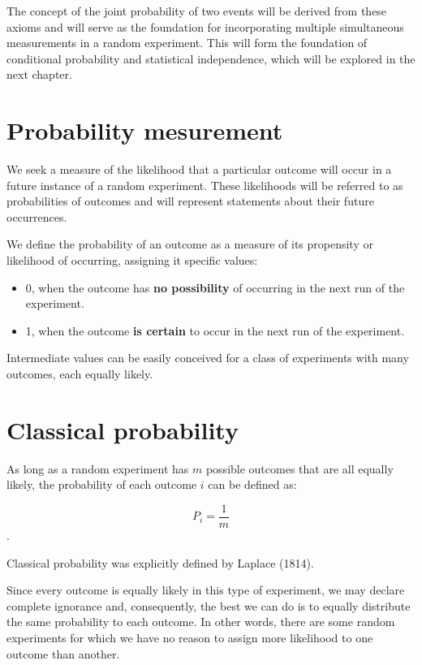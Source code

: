 \documentclass[
]{book}
\providecommand{\tightlist}{%
  \setlength{\itemsep}{0pt}\setlength{\parskip}{0pt}}
\begin{document}
The concept of the joint probability of two events will be derived from these axioms and will serve as the foundation for incorporating multiple simultaneous measurements in a random experiment. This will form the foundation of conditional probability and statistical independence, which will be explored in the next chapter.

\hypertarget{probability-mesurement}{%
\section{Probability mesurement}\label{probability-mesurement}}

We seek a measure of the likelihood that a particular outcome will occur in a future instance of a random experiment. These likelihoods will be referred to as probabilities of outcomes and will represent statements about their future occurrences.

We define the probability of an outcome as a measure of its propensity or likelihood of occurring, assigning it specific values:

\begin{itemize}
\tightlist
\item
  0, when the outcome has \textbf{no possibility} of occurring in the next run of the experiment.
\item
  1, when the outcome \textbf{is certain} to occur in the next run of the experiment.
\end{itemize}

Intermediate values can be easily conceived for a class of experiments with many outcomes, each equally likely.

\hypertarget{classical-probability}{%
\section{Classical probability}\label{classical-probability}}

As long as a random experiment has \(m\) possible outcomes that are all equally likely, the probability of each outcome \(i\) can be defined as:

\[P_i =\frac{1}{m}\].

Classical probability was explicitly defined by Laplace (1814).

Since every outcome is equally likely in this type of experiment, we may declare complete ignorance and, consequently, the best we can do is to equally distribute the same probability to each outcome. In other words, there are some random experiments for which we have no reason to assign more likelihood to one outcome than another.
\end{document}
